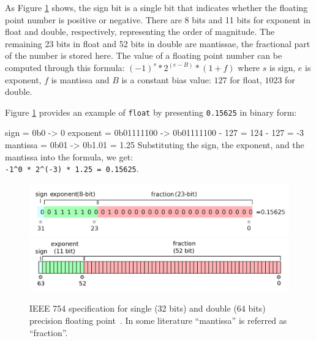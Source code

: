 \documentclass[logo,bsc,singlespacing,parskip]{infthesis}
\newcommand{\dtfloat}{\texttt{float}}
\newenvironment{VerbatimCompact}
  {\vspace*{-2.5mm}\VerbatimEnvironment
   \par\Verbatim}
  {\endVerbatim\vspace*{-2.4mm}}
\begin{document}
As Figure \ref{fig:ieee-f32} shows, the sign bit is a single bit that indicates whether the
floating point number is positive or negative. There are 8
bits and 11 bits for exponent in float and double, respectively, representing
the order of magnitude. The remaining 23 bits in float and 52 bits in double are
mantissae, the fractional part of the number is stored here. The value of a floating
point number can be computed through this formula: 
\begin{math} (-1)^s * 2^{(e - B)} * (1 + f)\end{math}
where \begin{math}s\end{math} is sign, \begin{math}e\end{math} is exponent, 
\begin{math}f\end{math} is mantissa and \begin{math}B\end{math} is a constant bias
value: \begin{math}127\end{math} for float, \begin{math}1023\end{math} for double. 

Figure \ref{fig:ieee-f32} provides an example of \dtfloat{} by presenting
\texttt{0.15625} in binary form:
\begin{VerbatimCompact}
sign     = 0b0        -> 0
exponent = 0b01111100 -> 0b01111100 - 127 = 124 - 127 = -3
mantissa = 0b01       -> 0b1.01 = 1.25
\end{VerbatimCompact}
Substituting the sign, the exponent, and the mantissa into the formula, we get: \\
\texttt{-1\^{}0 * 2\^{}(-3) * 1.25 = 0.15625}.



\begin{figure}
    \begin{center}
        \includegraphics[width=\linewidth]{image/ieee-f32.png}
        \includegraphics[width=\linewidth]{image/ieee-f64.png}
        \caption{IEEE 754 specification for single (32 bits) and double (64
        bits) precision floating point~\cite{ieee754-diagram}. In some
        literature ``mantissa'' is referred as ``fraction''.}
        \label{fig:ieee-f32}
    \end{center}
\end{figure}
\end{document}
